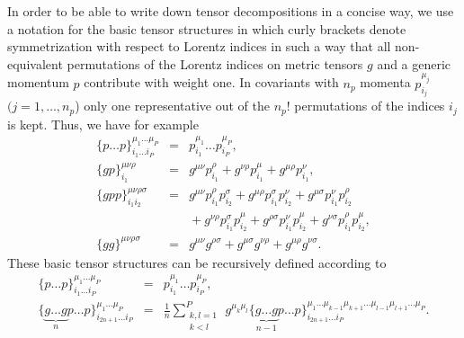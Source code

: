 \documentclass[preprint,sort&compress,12pt]{elsarticle}
\def\beqar{\begin{eqnarray}}
\def\eeqar{\end{eqnarray}}
\def\nn{\nonumber}
\def\si{\sigma}
\def\refeq#1{\mbox{(\ref{#1})}}
\def\citere#1{\mbox{Ref.~\cite{#1}}}
\newcommand{\np}{n_p}
\def\nl{\nonumber\\}
\begin{document}
In order to be able to write down tensor decompositions in a
concise way, we use a notation for the basic tensor structures 
in which curly brackets denote symmetrization
with respect to Lorentz indices in such a way that all non-equivalent
permutations of the Lorentz indices on metric tensors $g$ and a
generic momentum $p$ contribute with weight one. In covariants
with $\np$ momenta $p_{i_j}^{\mu_j}$ $(j=1,\dots,\np$) only one
representative out of the $\np!$ permutations of the indices $i_j$ is
kept.  Thus, we have for example
\beqar
\{p\ldots p\}^{\mu_1\ldots\mu_P}_{i_1\ldots i_P} &=& 
p_{i_1}^{\mu_1}\ldots p_{i_P}^{\mu_P},
\nn\\[.3em]
\{g p\}_{i_1}^{\mu\nu\rho} &=& 
g^{\mu\nu}p_{i_1}^{\rho}+g^{\nu\rho}p_{i_1}^{\mu}+g^{\mu\rho}p_{i_1}^{\nu},
\nn\\[.3em]
\{g pp \}^{\mu\nu\rho\si}_{i_1 i_2} &=& 
 g^{\mu\nu}p_{i_1}^{\rho}p_{i_2}^{\si}
+g^{\mu\rho}p_{i_1}^{\si}p_{i_2}^{\nu}
+g^{\mu\si}p_{i_1}^{\nu}p_{i_2}^{\rho}\nl&&{}
+g^{\nu\rho}p_{i_1}^{\si}p_{i_2}^{\mu}
+g^{\rho\si}p_{i_1}^{\nu}p_{i_2}^{\mu}
+g^{\nu\si}p_{i_1}^{\rho}p_{i_2}^{\mu},
\nn\\[.3em]
\{gg\}^{\mu\nu\rho\si} &=& g^{\mu\nu}g^{\rho\si}+g^{\mu\si}g^{\nu\rho}
+g^{\mu\rho}g^{\nu\si}.
\label{eq:covbrace}
\eeqar
These basic tensor structures can be recursively defined according to
\beqar
\{p\ldots p\}^{\mu_1\ldots\mu_P}_{i_1\ldots i_P} &=& 
p_{i_1}^{\mu_1}\ldots p_{i_P}^{\mu_P},\label{eq:MomTen}
\\[.3em]
\{\underbrace{g \ldots g}_n  p\ldots p\}^{\mu_1\ldots\mu_P}_{i_{2n+1}\ldots i_P}
&=& \frac{1}{n}
\sum_{\substack{k,l=1\\k<l}}^P \, g^{\mu_k\mu_l}
\{\underbrace{g \ldots g}_{n-1}  p\ldots p\}^{\mu_1\ldots\mu_{k-1}\mu_{k+1}\ldots\mu_{l-1}\mu_{l+1}\ldots\mu_P}_{i_{2n+1}\ldots i_P}.
\nn
\eeqar
\end{document}

